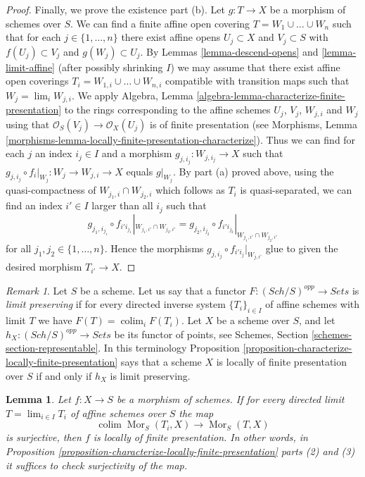 \documentclass{stacks-project}
\theoremstyle{plain}
\newtheorem{lemma}[subsection]{Lemma}
\theoremstyle{definition}
\theoremstyle{remark}
\newtheorem{remark}[subsection]{Remark}
\numberwithin{equation}{subsection}
\def\lim{\mathop{\mathrm{lim}}\nolimits}
\def\colim{\mathop{\mathrm{colim}}\nolimits}
\def\Sch{\mathit{Sch}}
\def\Mor{\mathop{\mathrm{Mor}}\nolimits}
\begin{document}
\begin{proof}
\medskip\noindent
Finally, we prove the existence part (b).
Let $g : T \to X$ be a morphism of schemes over $S$.
We can find a finite affine open covering
$T = W_1 \cup \ldots \cup W_n$ such that for
each $j \in \{1, \ldots, n\}$ there exist affine opens
$U_j \subset X$ and $V_j \subset S$ with $f(U_j) \subset V_j$
and $g(W_j) \subset U_j$. By Lemmas \ref{lemma-descend-opens}
and \ref{lemma-limit-affine}
(after possibly shrinking $I$) we may assume that
there exist affine open coverings $T_i = W_{1, i} \cup \ldots \cup W_{n, i}$
compatible with transition maps such that $W_j = \lim_i W_{j, i}$.
We apply Algebra, Lemma \ref{algebra-lemma-characterize-finite-presentation}
to the rings corresponding to the affine schemes $U_j$, $V_j$, $W_{j, i}$ and
$W_j$ using that $\mathcal{O}_S(V_j) \to \mathcal{O}_X(U_j)$ is of finite
presentation (see Morphisms,
Lemma \ref{morphisms-lemma-locally-finite-presentation-characterize}).
Thus we can find for each $j$ an index $i_j \in I$ and a morphism
$g_{j, i_j} : W_{j, i_j} \to X$ such that
$g_{j, i_j} \circ f_i|_{W_j} : W_j \to W_{j, i} \to X$
equals $g|_{W_j}$. By part (a) proved above, using the quasi-compactness of
$W_{j_1, i} \cap W_{j_2, i}$ which follows as $T_i$ is quasi-separated,
we can find an index $i' \in I$ larger than all $i_j$ such that
$$
g_{j_1, i_{j_1}} \circ f_{i'i_{j_1}}|_{W_{j_1, i'} \cap W_{j_2, i'}} =
g_{j_2, i_{j_2}} \circ f_{i'i_{j_2}}|_{W_{j_1, i'} \cap W_{j_2, i'}}
$$
for all $j_1, j_2 \in \{1, \ldots, n\}$. Hence the morphisms
$g_{j, i_j} \circ f_{i'i_j}|_{W_{j, i'}}$ glue to given the
desired morphism $T_{i'} \to X$.
\end{proof}

\begin{remark}
\label{remark-limit-preserving}
Let $S$ be a scheme. Let us say that a functor
$F : (\Sch/S)^{opp} \to \textit{Sets}$ is
{\it limit preserving} if for every directed inverse system
$\{T_i\}_{i \in I}$ of affine schemes with limit $T$ we have
$F(T) = \colim_i F(T_i)$. Let $X$ be a scheme over $S$, and
let $h_X : (\Sch/S)^{opp} \to \textit{Sets}$ be its
functor of points, see
Schemes, Section \ref{schemes-section-representable}.
In this terminology
Proposition \ref{proposition-characterize-locally-finite-presentation}
says that a scheme $X$ is locally of finite presentation over
$S$ if and only if $h_X$ is limit preserving.
\end{remark}

\begin{lemma}
\label{lemma-surjection-is-enough}
Let $f : X \to S$ be a morphism of schemes. If for every directed limit
$T = \lim_{i \in I} T_i$ of affine schemes over $S$ the map
$$
\colim \Mor_S(T_i, X) \longrightarrow \Mor_S(T, X)
$$
is surjective, then $f$ is locally of finite presentation.
In other words, in
Proposition \ref{proposition-characterize-locally-finite-presentation}
parts (2) and (3) it suffices to check surjectivity of the map.
\end{lemma}
\end{document}
